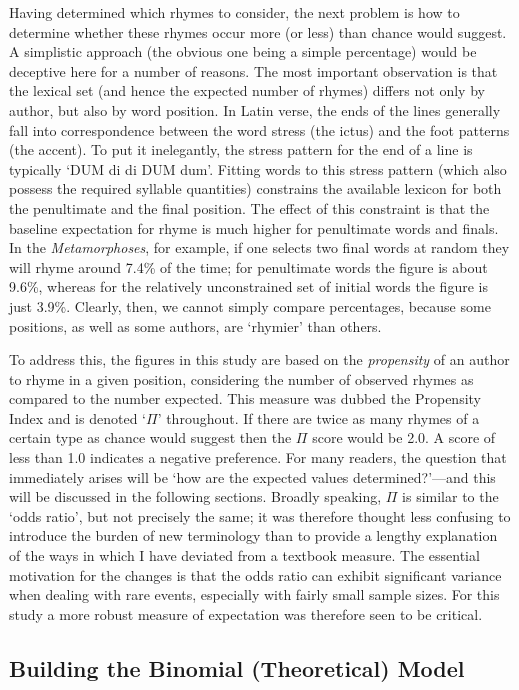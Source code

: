 \documentclass[twocolumn, switch, a4paper]{article} %
\begin{document}
Having determined which rhymes to consider, the next problem is how to
determine whether these rhymes occur more (or less) than chance would suggest.
A simplistic approach (the obvious one being a simple percentage) would be
deceptive here for a number of reasons. The most important observation is that
the lexical set (and hence the expected number of rhymes) differs not only by
author, but also by word position. In Latin verse, the ends of the lines
generally fall into correspondence between the word stress (the ictus) and the
foot patterns (the accent). To put it inelegantly, the stress pattern for the
end of a line is typically `DUM di di DUM dum'. Fitting words to this stress
pattern (which also possess the required syllable quantities) constrains the
available lexicon for both the penultimate and the final position. The effect
of this constraint is that the baseline expectation for rhyme is much higher
for penultimate words and finals. In the \emph{Metamorphoses}, for example, if
one selects two final words at random they will rhyme around 7.4\% of the
time; for penultimate words the figure is about 9.6\%, whereas for the
relatively unconstrained set of initial words the figure is just 3.9\%.
Clearly, then, we cannot simply compare percentages, because some positions,
as well as some authors, are `rhymier' than others.

To address this, the figures in this study are based on the \emph{propensity}
of an author to rhyme in a given position, considering the number of observed
rhymes as compared to the number expected. This measure was dubbed the
Propensity Index and is denoted `$\Pi$' throughout. If there are twice as many
rhymes of a certain type as chance would suggest then the $\Pi$ score would be
2.0. A score of less than 1.0 indicates a negative preference. For many
readers, the question that immediately arises will be `how are the expected
values determined?'---and this will be discussed in the following sections.
Broadly speaking, $\Pi$ is similar to the `odds ratio', but not precisely
the same; it was therefore thought less confusing to introduce the burden of
new terminology than to provide a lengthy explanation of the ways in which I
have deviated from a textbook measure. The essential motivation for the
changes is that the odds ratio can exhibit significant variance when dealing
with rare events, especially with fairly small sample sizes. For this study a
more robust measure of expectation was therefore seen to be critical.

\subsection{Building the Binomial (Theoretical) Model} 
\end{document}
